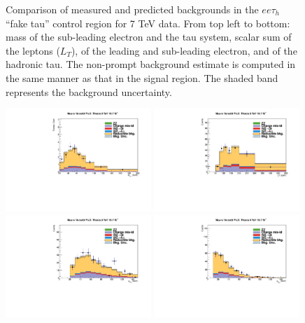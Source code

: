 \begin{figure}
\begin{center}
  \caption{Comparison of measured and predicted backgrounds in the $ee\tau_h$ ``fake tau'' control region for 7 TeV data.
  From top left to bottom: mass of the sub-leading electron and the tau system, scalar sum of the leptons \pT ($L_T$), \pT of the leading and sub-leading electron, and \pT of the hadronic tau.
  The non-prompt background estimate is computed in the same manner as that in the signal region.
  The shaded band represents the background uncertainty.
  }
  \label{fig:LLT_eet_f3_control_7TeV}
\end{center}
\end{figure}

\begin{figure}
\begin{center}
  \includegraphics[width=0.49\textwidth]{4_Analisys/pics/8TeV/plots/eet/f3/Full/final-f3-subMass-Full.pdf}
  \includegraphics[width=0.49\textwidth]{4_Analisys/pics/8TeV/plots/eet/f3/final-f3-LT.pdf}\\
  \includegraphics[width=0.49\textwidth]{4_Analisys/pics/8TeV/plots/eet/f3/Full/final-f3-e1Pt-Full.pdf}
  \includegraphics[width=0.49\textwidth]{4_Analisys/pics/8TeV/plots/eet/f3/Full/final-f3-e2Pt-Full.pdf}\\

\end{center}
\end{figure}
